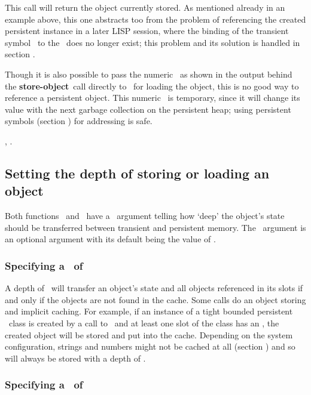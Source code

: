 This call will return the object currently stored. As mentioned
already in an example above, this one abstracts too from the problem
of referencing the created persistent instance in a later LISP
session, where the binding of the transient symbol \ to
the \objid\ does no longer exist; this problem and its solution is
handled in section .

Though it is also possible to pass the numeric \objid\ as shown in the
output behind the \textbf{store-object}\ call directly to
\ for loading the object, this is no good way to
reference a persistent object. This numeric \objid\ is temporary,
since it will change its value with the next garbage collection on the
persistent heap; using persistent symbols (section
) for addressing is safe.

 {}, .

\subsection{Setting the depth of storing or loading an object}

Both functions \ and \ have a
\ argument telling how `deep' the object's state should
be transferred between transient and persistent memory. The
\ argument is an optional argument with its default
being the value of .

\subsubsection{Specifying a \protect{}\ of
  \protect{}}

A depth of \ will transfer an object's state and all
objects referenced in its slots if and only if the objects are not
found in the cache. Some calls do an object storing and implicit
caching. For example, if an instance of a tight bounded persistent
\clos\ class is created by a call to \ and at
least one slot of the class has an , the created
object will be stored and put into the cache. Depending on the system
configuration, strings and numbers might not be cached at all (section
) and so will always be stored with a depth of
.

\subsubsection{Specifying a \protect{}\ of
  \protect{}}

